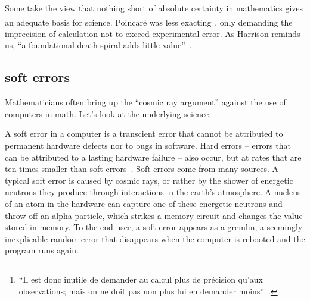 \documentclass{llncs}
\begin{document}
Some take the view that nothing short of absolute certainty in
mathematics gives an adequate basis for science.  Poincar\'e was less
exacting\footnote{``Il est donc inutile de demander au calcul plus de pr\'ecision
qu'aux observations; mais on ne doit pas non plus lui en demander moins''~\cite{HPMC}.}, 
only demanding the imprecision of calculation not to exceed
 experimental error.  As Harrison reminds us, 
``a foundational death spiral adds little value''~\cite{harrison-pm}.





\subsection{soft errors}\label{sec:soft}

Mathematicians often bring up the ``cosmic ray argument'' against the use
of computers in math.  Let's look at the underlying science.

A soft error in a computer is a transcient error that cannot be
attributed to permanent hardware defects nor to bugs in software.  
Hard errors -- errors that can be attributed to a lasting hardware failure --
also occur, but at rates that are ten times smaller than
soft errors~\cite{MW04}.
Soft errors come from many sources. A
typical soft error is caused by cosmic rays, or rather by the shower
of energetic neutrons they produce through interactions in the earth's
atmosphere.  A nucleus of an atom in the hardware can capture one of
these energetic neutrons and throw off an alpha particle, which
strikes a memory circuit and changes the value stored in memory.  To
the end user, a soft error appears as a gremlin, a seemingly
inexplicable random error that disappears when the computer is rebooted and
the program runs again.
\end{document}
